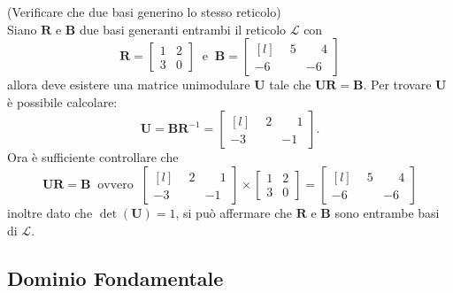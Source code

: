 \begin{exmp} (Verificare che due basi generino lo stesso reticolo)
    \label{exp:basis}
    \\
    Siano $\mathbf{R}$ e $\mathbf{B}$ due basi generanti entrambi il reticolo $\mathcal{L}$
    con
    \begin{equation*}
        \mathbf{R} =
        \begin{bmatrix}
            1 & 2\\
            3 & 0
        \end{bmatrix}
        \ \text{ e } \ 
        \mathbf{B} =
        \begin{bmatrix*}[l]
            \phantom{-}5 & \phantom{-}4\\
            -6 & -6
        \end{bmatrix*}
    \end{equation*}
    allora deve esistere una matrice unimodulare $\mathbf{U}$ tale che 
    $\mathbf{U}\mathbf{R} = \mathbf{B}$. Per trovare $\mathbf{U}$ è possibile
    calcolare:
    \begin{equation*}
        \mathbf{U} = \mathbf{B}\mathbf{R}^{-1} =
        \begin{bmatrix*}[l]
            \phantom{-}2 & \phantom{-}1\\
            -3 & -1
        \end{bmatrix*}.
    \end{equation*}
    Ora è sufficiente controllare che
    \begin{equation*}
        \mathbf{U}\mathbf{R} = \mathbf{B}
        \ \text{ ovvero } \
        \begin{bmatrix*}[l]
            \phantom{-}2 & \phantom{-}1\\
            -3 & -1
        \end{bmatrix*}
        \times
        \begin{bmatrix}
            1 & 2\\
            3 & 0
        \end{bmatrix}
        =
        \begin{bmatrix*}[l]
            \phantom{-}5 & \phantom{-}4\\
            -6 & -6
        \end{bmatrix*}
    \end{equation*}
inoltre dato che $\det(\mathbf{U}) = 1$, si può affermare che $\mathbf{R}$ e $\mathbf{B}$
sono entrambe basi di $\mathcal{L}$.
\end{exmp}
\subsection{Dominio Fondamentale}
\label{sec:dominio}



